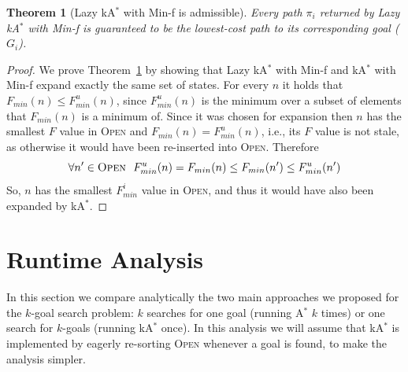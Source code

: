 \documentclass{aicom2e}
\newtheorem{theorem}{Theorem}
\newcommand{\kgs}{$k$-goal search}
\newcommand{\astar}{A$^*$}
\newcommand{\kastar}{kA$^*$}
\newcommand{\minf}{Min-f}
\newcommand{\open}{\textsc{Open}}
\begin{document}
\begin{theorem}[Lazy \kastar{} with \minf{} is admissible]
Every path $\pi_i$ returned by Lazy \kastar{} with \minf{} is guaranteed to be the lowest-cost path to its corresponding goal ($G_i$).
\label{the:lazy-minf-correct}
\end{theorem}
\begin{proof}
	We prove Theorem~\ref{the:lazy-minf-correct} by showing that Lazy \kastar{} with \minf{} and \kastar{} with \minf{} expand exactly the same set of states. For every $n$ it holds that $F_{min}(n)\leq F^u_{min}(n)$, since $F^u_{min}(n)$ is the minimum over a subset of elements that $F_{min}(n)$ is a minimum of. 
	Since it was chosen for expansion then $n$ has the smallest $F$ value in \open{}
	and $F_{min}(n)=F^u_{min}(n)$, i.e., its $F$ value is not stale, as otherwise it would have been re-inserted into \open{}. Therefore 
	\[ \forall n'\in\open{} ~~ F^u_{min}(n)=F_{min}(n)\leq F_{min}(n') \leq F^u_{min}(n') \]
	So, $n$ has the smallest $F^i_{min}$ value in \open{}, and thus it would have also been expanded by \kastar{}. 
\end{proof}

	



\section{Runtime Analysis}
In this section we compare analytically the two main approaches we proposed for the \kgs{} problem: $k$ searches for one goal (running \astar{} $k$ times) or one search for $k$-goals (running \kastar{} once). 
In this analysis we will assume that \kastar{} is implemented by eagerly re-sorting \open{} whenever a goal is found, to make the analysis simpler. 
\end{document}
